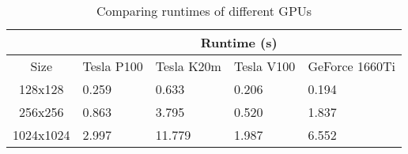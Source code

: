 \begin{table}[ht]
\vspace{-5mm}
\centering
\caption{Comparing runtimes of different GPUs}
\vspace{1mm}
\begin{tabular}{|c||p{3.5em}|p{3.5em}|p{3.5em}|p{4em}|}
    \hline
    & \multicolumn{4}{|c|}{Runtime (s)}\\
    \hline
    Size & Tesla P100 & Tesla K20m & Tesla V100 & GeForce 1660Ti \\
    \hline
    128x128 & 0.259 & 0.633 & 0.206 & 0.194 \\
    \hline
    256x256 & 0.863 & 3.795 & 0.520 & 1.837 \\
    \hline
    1024x1024 & 2.997 & 11.779 & 1.987 & 6.552 \\
    \hline
\end{tabular}
\label{table:different-devices-gpus}
\vspace{-3mm}
\end{table}

